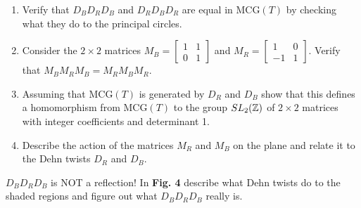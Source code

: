 \begin{exercise}
	\begin{enumerate}
		\item Verify that $D_B D_R D_B$ and $D_R D_B D_R$ are equal in $\mathrm{MCG}(T)$ by checking what they do to the principal circles.
		\item Consider the $2 \times 2$ matrices $M_B = \begin{bmatrix} 1 & 1 \\ 0 & 1 \end{bmatrix}$ and $M_R = \begin{bmatrix} 1 & 0 \\ -1 & 1 \end{bmatrix}$. Verify that $M_B M_R M_B = M_R M_B M_R$.
		\item Assuming that $\mathrm{MCG}(T)$ is generated by $D_R$ and $D_B$ show that this defines a homomorphism from $\mathrm{MCG}(T)$ to the group $SL_2(\mathbb{Z})$ of $2 \times 2$ matrices with integer coefficients and determinant 1.
		\item Describe the action of the matrices $M_R$ and $M_B$ on the plane and relate it to the Dehn twists $D_R$ and $D_B$.
	\end{enumerate}
\end{exercise}

\begin{exercise}
	$D_B D_R D_B$ is NOT a reflection! In \textbf{Fig. 4} describe what Dehn twists do to the shaded regions and figure out what $D_B D_R D_B$ really is.
\end{exercise}




